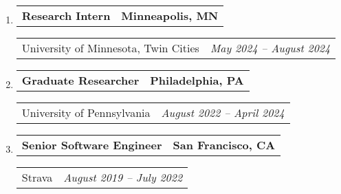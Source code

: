 \documentclass[letterpaper]{article}
\makeatletter
\newif\iflong
\newcommand*{\tabulardef}[3]{\begin{tabular}[t]{@{}lp{\dimexpr\linewidth-#1}@{}}
    #2&#3
\end{tabular}}
\newcommand{\headerrow}[2]
{\begin{tabular*}{\linewidth}{l@{\extracolsep{\fill}}r}
	#1 &
	#2 \\
\end{tabular*}}
\makeatother
\begin{document}
\begin{enumerate}[label=]
	\parskip=-0.05em

	\item
		\headerrow
			{\textbf{Research Intern}}
			{\textbf{Minneapolis, MN}}
	\headerrow
		{University of Minnesota, Twin Cities}
        {\emph{May 2024 -- August 2024}}
    \iflong
	\begin{enumerate}[label= *]
	\parskip=-0.1em
        \item Study the theoretical foundations of type theory
        \item Build proof assistants or related software components
	\end{enumerate}
    \fi

	\item
		\headerrow
			{\textbf{Graduate Researcher}}
			{\textbf{Philadelphia, PA}}
	\headerrow
        {University of Pennsylvania}
        {\emph{August 2022 -- April 2024}}
    \iflong
	\begin{enumerate}[label= *]
	\parskip=-0.1em
        \item\tabulardef{4cm}{}{Studied the duality of effects and coeffects in call-by-push-value.
            Formalized properties of type-and-effect system in Agda.}
        \item\tabulardef{4cm}{}{Developed a proof by logical relations that can be used for teach
            ing the technique of logical relations with a proof assistant.}
        \item\tabulardef{4cm}{}{Wrote an online tutorial for normalization-by-evaluation (NbE) in
            literate Agda. Formalized correctness of NbE for the simply-typed lambda calculus.}
        \item\tabulardef{4cm}{}{Formalized a type system and semantics for DeFINE, a programming
            language for the network data plane}
	\end{enumerate}
    \fi

	\item
		\headerrow
			{\textbf{Senior Software Engineer}}
			{\textbf{San Francisco, CA}}
	\headerrow
		{Strava}
		{\emph{August 2019 -- July 2022}}
    \iflong
	\begin{enumerate}[label= *]
	\parskip=-0.1em
        \item Led the design and implementation of core system for modeling types of activities
        \item Mentored junior engineers in microservice architecture and Scala programming
		\item Used Apache Spark to build a geospatial data export tool for city planners
		\item Built tools to verify and ensure correctness of internal route data
		\item Developed a Scala microservice to serve all static maps in product
	\end{enumerate}
    \fi
\end{enumerate}
\end{document}
